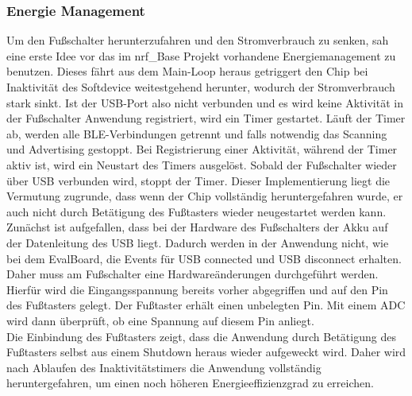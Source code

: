 \subsubsection{Energie Management}
\label{EnergieManagement}
Um den Fußschalter herunterzufahren und den Stromverbrauch zu senken, sah eine erste Idee vor das im nrf\_Base Projekt vorhandene Energiemanagement zu benutzen. Dieses fährt aus dem Main-Loop heraus getriggert den Chip bei Inaktivität des Softdevice weitestgehend herunter, wodurch der Stromverbrauch stark sinkt. Ist der \ac{USB}-Port also nicht verbunden und es wird keine Aktivität in der Fußschalter Anwendung registriert, wird ein Timer gestartet. Läuft der Timer ab, werden alle \ac{BLE}-Verbindungen getrennt und falls notwendig das Scanning und Advertising gestoppt. Bei Registrierung einer Aktivität, während der Timer aktiv ist, wird ein Neustart des Timers ausgelöst. Sobald der Fußschalter wieder über \ac{USB} verbunden wird, stoppt der Timer. Dieser Implementierung liegt die Vermutung zugrunde, dass wenn der Chip vollständig heruntergefahren wurde, er auch nicht durch Betätigung des Fußtasters wieder neugestartet werden kann.\\
Zunächst ist aufgefallen, dass bei der Hardware des Fußschalters der Akku auf der Datenleitung des \ac{USB} liegt. Dadurch werden in der Anwendung nicht, wie bei dem EvalBoard, die Events für \ac{USB} connected und \ac{USB} disconnect erhalten. Daher muss am Fußschalter eine Hardwareänderungen durchgeführt werden. Hierfür wird die Eingangsspannung bereits vorher abgegriffen und auf den Pin des Fußtasters gelegt. Der Fußtaster erhält einen unbelegten Pin. Mit einem \ac{ADC} wird dann überprüft, ob eine Spannung auf diesem Pin anliegt.\\
Die Einbindung des Fußtasters zeigt, dass die Anwendung durch Betätigung des Fußtasters selbst aus einem Shutdown heraus wieder aufgeweckt wird. Daher wird nach Ablaufen des Inaktivitätstimers die Anwendung vollständig heruntergefahren, um einen noch höheren Energieeffizienzgrad zu erreichen.

